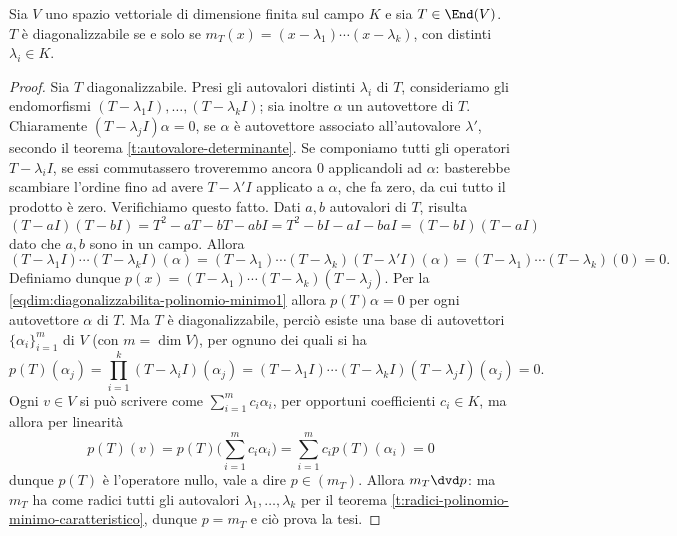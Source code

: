 \begin{teorema} \label{t:diagonalizzabilita-polinomio-minimo}
	Sia $V$ uno spazio vettoriale di dimensione finita sul campo $K$ e sia $T\in\End(V)$.
	$T$ è diagonalizzabile se e solo se $m_T(x)=(x-\lambda_1)\cdots(x-\lambda_k)$, con distinti $\lambda_i\in K$.
\end{teorema}
\begin{proof}
	Sia $T$ diagonalizzabile.
	Presi gli autovalori distinti $\lambda_i$ di $T$, consideriamo gli endomorfismi $(T-\lambda_1 I),\dots,(T-\lambda_k I)$; sia inoltre $\alpha$ un autovettore di $T$.
	Chiaramente $(T-\lambda_j I)\alpha=0$, se $\alpha$ è autovettore associato all'autovalore $\lambda'$, secondo il teorema \ref{t:autovalore-determinante}.
	Se componiamo tutti gli operatori $T-\lambda_iI$, se essi commutassero troveremmo ancora 0 applicandoli ad $\alpha$: basterebbe scambiare l'ordine fino ad avere $T-\lambda' I$ applicato a $\alpha$, che fa zero, da cui tutto il prodotto è zero.
	Verifichiamo questo fatto.
	Dati $a,b$ autovalori di $T$, risulta
	\begin{equation}
		(T-aI)(T-bI)=T^2-aT-bT-abI=T^2-bI-aI-baI=(T-bI)(T-aI)
	\end{equation}
	dato che $a,b$ sono in un campo.
	Allora
	\begin{equation}
		(T-\lambda_1 I)\cdots(T-\lambda_k I)(\alpha) = (T-\lambda_1)\cdots(T-\lambda_k)(T-\lambda'I)(\alpha) = (T-\lambda_1)\cdots(T-\lambda_k)(0)=0.
		\label{eqdim:diagonalizzabilita-polinomio-minimo1}
	\end{equation}
	Definiamo dunque $p(x) = (T-\lambda_1)\cdots(T-\lambda_k)(T-\lambda_j)$.
	Per la \ref{eqdim:diagonalizzabilita-polinomio-minimo1} allora $p(T)\alpha = 0$ per ogni autovettore $\alpha$ di $T$.
	Ma $T$ è diagonalizzabile, perciò esiste una base di autovettori $\{\alpha_i\}_{i=1}^m$ di $V$ (con $m=\dim V$), per ognuno dei quali si ha
	\begin{equation}
		p(T)(\alpha_j)=\prod_{i=1}^k(T-\lambda_iI)(\alpha_j)=(T-\lambda_1I)\cdots(T-\lambda_kI)(T-\lambda_jI)(\alpha_j)=0.
	\end{equation}
	Ogni $v\in V$ si può scrivere come $\sum_{i=1}^mc_i\alpha_i$, per opportuni coefficienti $c_i\in K$, ma allora per linearità
	\begin{equation}
		p(T)(v)=p(T)\Big(\sum_{i=1}^mc_i\alpha_i\Big)=\sum_{i=1}^mc_ip(T)(\alpha_i)=0
	\end{equation}
	dunque $p(T)$ è l'operatore nullo, vale a dire $p\in (m_T)$.
	Allora $m_T\dvd p$: ma $m_T$ ha come radici tutti gli autovalori $\lambda_1,\dots,\lambda_k$ per il teorema \ref{t:radici-polinomio-minimo-caratteristico}, dunque $p=m_T$ e ciò prova la tesi. 


\end{proof}
